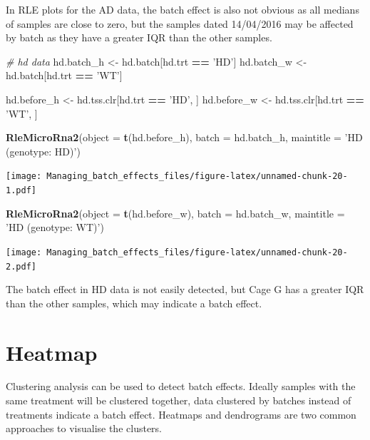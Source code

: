 \documentclass[]{book}
\newenvironment{Shaded}{\begin{snugshade}}{\end{snugshade}}
\newcommand{\KeywordTok}[1]{\textcolor[rgb]{0.13,0.29,0.53}{\textbf{#1}}}
\newcommand{\DataTypeTok}[1]{\textcolor[rgb]{0.13,0.29,0.53}{#1}}
\newcommand{\StringTok}[1]{\textcolor[rgb]{0.31,0.60,0.02}{#1}}
\newcommand{\CommentTok}[1]{\textcolor[rgb]{0.56,0.35,0.01}{\textit{#1}}}
\newcommand{\OperatorTok}[1]{\textcolor[rgb]{0.81,0.36,0.00}{\textbf{#1}}}
\newcommand{\NormalTok}[1]{#1}
\begin{document}
In RLE plots for the AD data, the batch effect is also not obvious as
all medians of samples are close to zero, but the samples dated
14/04/2016 may be affected by batch as they have a greater IQR than the
other samples.

\begin{Shaded}
\begin{Highlighting}[]
\CommentTok{# hd data}
\NormalTok{hd.batch_h <-}\StringTok{ }\NormalTok{hd.batch[hd.trt }\OperatorTok{==}\StringTok{ 'HD'}\NormalTok{]}
\NormalTok{hd.batch_w <-}\StringTok{ }\NormalTok{hd.batch[hd.trt }\OperatorTok{==}\StringTok{ 'WT'}\NormalTok{] }

\NormalTok{hd.before_h <-}\StringTok{ }\NormalTok{hd.tss.clr[hd.trt }\OperatorTok{==}\StringTok{ 'HD'}\NormalTok{, ]}
\NormalTok{hd.before_w <-}\StringTok{ }\NormalTok{hd.tss.clr[hd.trt }\OperatorTok{==}\StringTok{ 'WT'}\NormalTok{, ]}

\KeywordTok{RleMicroRna2}\NormalTok{(}\DataTypeTok{object =} \KeywordTok{t}\NormalTok{(hd.before_h), }\DataTypeTok{batch =}\NormalTok{ hd.batch_h, }
             \DataTypeTok{maintitle =} \StringTok{'HD (genotype: HD)'}\NormalTok{)}
\end{Highlighting}
\end{Shaded}

\texttt{[image: Managing\_batch\_effects\_files/figure-latex/unnamed-chunk-20-1.pdf]}

\begin{Shaded}
\begin{Highlighting}[]
\KeywordTok{RleMicroRna2}\NormalTok{(}\DataTypeTok{object =} \KeywordTok{t}\NormalTok{(hd.before_w), }\DataTypeTok{batch =}\NormalTok{ hd.batch_w, }
             \DataTypeTok{maintitle =} \StringTok{'HD (genotype: WT)'}\NormalTok{)}
\end{Highlighting}
\end{Shaded}

\texttt{[image: Managing\_batch\_effects\_files/figure-latex/unnamed-chunk-20-2.pdf]}

The batch effect in HD data is not easily detected, but Cage G has a
greater IQR than the other samples, which may indicate a batch effect.

\section{Heatmap}\label{heatmap}

Clustering analysis can be used to detect batch effects. Ideally samples
with the same treatment will be clustered together, data clustered by
batches instead of treatments indicate a batch effect. Heatmaps and
dendrograms are two common approaches to visualise the clusters.
\end{document}

